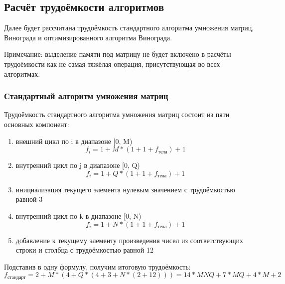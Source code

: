 \subsection{Расчёт трудоёмкости алгоритмов}

Далее будет рассчитана трудоёмкость стандартного алгоритма умножения матриц, Винограда и оптимизированного алгоритма Винограда.

Примечание: выделение памяти под матрицу не будет включено в расчёты трудоёмкости как не самая тяжёлая операция, присутствующая во всех алгоритмах.

\subsubsection{Стандартный алгоритм умножения матриц}

Трудоёмкость стандартного алгоритма умножения матриц состоит из пяти основных компонент:

\begin{enumerate}

\item внешний цикл по i в диапазоне [0, M)
\begin{equation}
f_i = 1 + M * (1 + 1 + f_{\text{тела}}) + 1
\end{equation}

\item внутренний цикл по j в диапазоне [0, Q)
\begin{equation}
f_i = 1 + Q * (1 + 1 + f_{\text{тела}}) + 1
\end{equation}

\item инициализация текущего элемента нулевым значением с трудоёмкостью равной 3


\item внутренний цикл по k в диапазоне [0, N)
\begin{equation}
f_i = 1 + N * (1 + 1 + f_{\text{тела}}) + 1
\end{equation}

\item добавление к текущему элементу произведения чисел из соответствующих строки и столбца с трудоёмкостью равной 12

\end{enumerate}

Подставив в одну формулу, получим итоговую трудоёмкость:
\begin{equation}
f_{\text{стандарт}} = 2 + M * (4 + Q * (4 + 3 + N * (2 + 12))) = 14 * MNQ + 7 * MQ + 4 * M  + 2
\end{equation}


